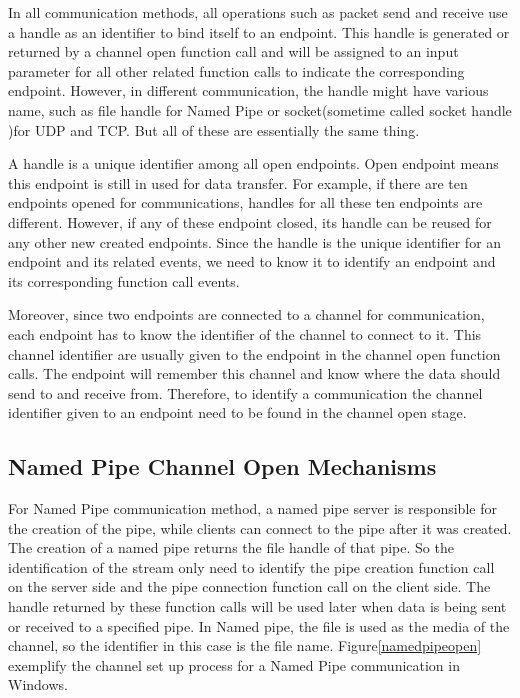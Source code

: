 In all communication methods, all operations such as packet send and receive use a handle as an identifier to bind itself to an endpoint. This handle is generated or returned by a channel open function call and will be assigned to an input parameter for all other related function calls to indicate the corresponding endpoint. However, in different communication, the handle might have various name, such as file handle for Named Pipe or socket(sometime called socket handle )for UDP and TCP. But all of these are essentially the same thing.

A handle is a unique identifier among all open endpoints. Open endpoint means this endpoint is still in used for data transfer. For example, if there are ten endpoints opened for communications, handles for all these ten endpoints are different. However, if any of these endpoint closed, its handle can be reused for any other new created endpoints. Since the handle is the unique identifier for an endpoint and its related events, we need to know it to identify an endpoint and its corresponding function call events. 

Moreover, since two endpoints are connected to a channel for communication, each endpoint has to know the identifier of the channel to connect to it. This channel identifier are usually given to the endpoint in the channel open function calls. The endpoint will remember this channel and know where the data should send to and receive from. Therefore, to identify a communication the channel identifier given to an endpoint need to be found in the channel open stage.

\subsection{Named Pipe Channel Open Mechanisms} 
For Named Pipe communication method, a named pipe server is responsible for the creation of the pipe, while clients can connect to the pipe after it was created. The creation of a named pipe returns the file handle of that pipe. So the identification of the stream only need to identify the pipe creation function call on the server side and the pipe connection function call on the client side. The  handle returned by these function calls will be used later when data is being sent or received to a specified pipe. In Named pipe, the file is used as the media of the channel, so the identifier in this case is the file name. Figure\ref{namedpipeopen} exemplify the channel set up process for a Named Pipe communication in Windows. 


